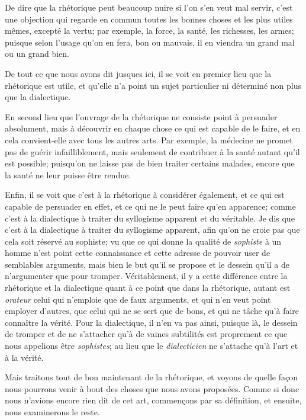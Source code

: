 De dire que la rhétorique peut beaucoup nuire si l'on s'en veut mal servir, c'est une objection qui regarde en commun toutes les bonnes choses et les plus
utiles mêmes, excepté la vertu; par exemple, la force, la santé, les richesses, les armes; puisque selon l'usage qu'on en fera, bon ou mauvais, il en viendra
un grand mal ou un grand bien. 

De tout ce que nous avons dit jusques ici, il se voit en premier lieu que la rhétorique est utile, et qu'elle n'a point un sujet particulier ni déterminé non
plus que la dialectique.

En second lieu que l'ouvrage de la rhétorique ne consiste point à persuader absolument, mais à découvrir en chaque chose ce qui est capable de le faire, et en
cela convient-elle avec tous les autres arts. Par exemple, la médecine ne promet pas de guérir infailliblement, mais seulement de contribuer à la santé autant
qu'il est possible; puisqu'on ne laisse pas de bien traiter certains malades, encore que la santé ne leur puisse être rendue.

Enfin, il se voit que c'est à la rhétorique à considérer également, et ce qui est capable de persuader en effet, et ce qui ne le peut faire qu'en apparence;
comme c'est à la dialectique à traiter du syllogisme apparent et du véritable. Je dis que c'est à la dialectique à traiter du syllogisme apparent, afin qu'on
ne croie pas que cela soit réservé au sophiste; vu que ce qui donne la qualité de \emph{sophiste} à un homme n'est point cette connaissance et cette adresse de
pouvoir user de semblables arguments, mais bien le but qu'il se propose et le dessein qu'il a de n'argumenter que pour tromper. Véritablement, il y a cette
différence entre la rhétorique et la dialectique quant à ce point que dans la rhétorique, autant est \emph{orateur} celui qui n'emploie que de faux arguments, et
qui n'en veut point employer d'autres, que celui qui ne se sert que de bons, et qui ne tâche qu'à faire connaître la vérité. Pour la dialectique, il n'en va pas
ainsi, puisque là, le dessein de tromper et de ne s'attacher qu'à de vaines subtilités est proprement ce que nous appelions être \emph{sophistes}; au lieu que le
\emph{dialecticien} ne s'attache qu'à l'art et à la vérité.

Mais traitons tout de bon maintenant de la rhétorique, et voyons de quelle façon nous pourrons venir à bout des choses que nous avons proposées. Comme si donc nous
n'avions encore rien dit de cet art, commençons par sa définition, et ensuite, nous examinerons le reste.

